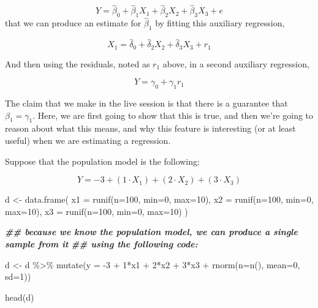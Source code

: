 \documentclass[
]{book}
\newenvironment{Shaded}{\begin{snugshade}}{\end{snugshade}}
\newcommand{\AttributeTok}[1]{\textcolor[rgb]{0.77,0.63,0.00}{#1}}
\newcommand{\DecValTok}[1]{\textcolor[rgb]{0.00,0.00,0.81}{#1}}
\newcommand{\DocumentationTok}[1]{\textcolor[rgb]{0.56,0.35,0.01}{\textbf{\textit{#1}}}}
\newcommand{\FunctionTok}[1]{\textcolor[rgb]{0.00,0.00,0.00}{#1}}
\newcommand{\NormalTok}[1]{#1}
\newcommand{\OtherTok}[1]{\textcolor[rgb]{0.56,0.35,0.01}{#1}}
\newcommand{\SpecialCharTok}[1]{\textcolor[rgb]{0.00,0.00,0.00}{#1}}
\theoremstyle{definition}
\theoremstyle{definition}
\theoremstyle{definition}
\theoremstyle{definition}
\theoremstyle{remark}
\begin{document}
\[ 
Y = \hat\beta_{0} + \hat\beta_{1} X_{1} + \hat\beta_{2} X_{2} + \hat\beta_{3}X_{3} + e
\]
that we can produce an estimate for \(\hat\beta_{1}\) by fitting this auxiliary regression,

\[
X_{1} = \hat\delta_{0} + \hat\delta_2X_2 + \hat\delta_3X_3 + r_{1}
\]

And then using the residuals, noted as \(r_1\) above, in a second auxiliary regression,

\[ 
Y = \gamma_0 + \gamma_1 r_1
\]

The claim that we make in the live session is that there is a guarantee that \(\beta_1 = \gamma_1\). Here, we are first going to show that this is true, and then we're going to reason about what this means, and why this feature is interesting (or at least useful) when we are estimating a regression.

Suppose that the population model is the following:

\[
Y = -3 + (1\cdot X_1) + (2\cdot X_2) + (3\cdot X_3)
\]

\begin{Shaded}
\begin{Highlighting}[]
\NormalTok{d }\OtherTok{\textless{}{-}} \FunctionTok{data.frame}\NormalTok{(}
  \AttributeTok{x1 =} \FunctionTok{runif}\NormalTok{(}\AttributeTok{n=}\DecValTok{100}\NormalTok{, }\AttributeTok{min=}\DecValTok{0}\NormalTok{, }\AttributeTok{max=}\DecValTok{10}\NormalTok{), }
  \AttributeTok{x2 =} \FunctionTok{runif}\NormalTok{(}\AttributeTok{n=}\DecValTok{100}\NormalTok{, }\AttributeTok{min=}\DecValTok{0}\NormalTok{, }\AttributeTok{max=}\DecValTok{10}\NormalTok{), }
  \AttributeTok{x3 =} \FunctionTok{runif}\NormalTok{(}\AttributeTok{n=}\DecValTok{100}\NormalTok{, }\AttributeTok{min=}\DecValTok{0}\NormalTok{, }\AttributeTok{max=}\DecValTok{10}\NormalTok{)}
\NormalTok{)}

\DocumentationTok{\#\# because we know the population model, we can produce a single sample from it }
\DocumentationTok{\#\# using the following code: }

\NormalTok{d }\OtherTok{\textless{}{-}}\NormalTok{ d }\SpecialCharTok{\%\textgreater{}\%} 
  \FunctionTok{mutate}\NormalTok{(}\AttributeTok{y =} \SpecialCharTok{{-}}\DecValTok{3} \SpecialCharTok{+} \DecValTok{1}\SpecialCharTok{*}\NormalTok{x1 }\SpecialCharTok{+} \DecValTok{2}\SpecialCharTok{*}\NormalTok{x2 }\SpecialCharTok{+} \DecValTok{3}\SpecialCharTok{*}\NormalTok{x3 }\SpecialCharTok{+} \FunctionTok{rnorm}\NormalTok{(}\AttributeTok{n=}\FunctionTok{n}\NormalTok{(), }\AttributeTok{mean=}\DecValTok{0}\NormalTok{, }\AttributeTok{sd=}\DecValTok{1}\NormalTok{))}

\FunctionTok{head}\NormalTok{(d)}
\end{Highlighting}
\end{Shaded}
\end{document}
